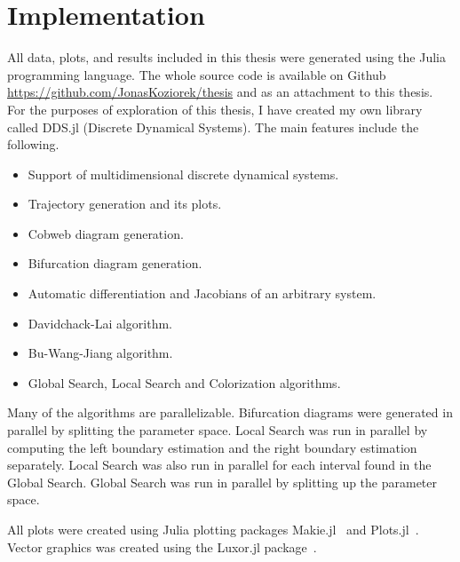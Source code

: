 \section{Implementation}
All data, plots, and results included in this thesis were generated using the Julia programming language.
The whole source code is available on Github \url{https://github.com/JonasKoziorek/thesis} and as an attachment to this thesis.
For the purposes of exploration of this thesis, I have created my own library called DDS.jl (Discrete Dynamical Systems).
The main features include the following.
\begin{itemize}
    \item Support of multidimensional discrete dynamical systems.
    \item Trajectory generation and its plots.
    \item Cobweb diagram generation.
    \item Bifurcation diagram generation.
    \item Automatic differentiation and Jacobians of an arbitrary system.
    \item Davidchack-Lai algorithm.
    \item Bu-Wang-Jiang algorithm.
    \item Global Search, Local Search and Colorization algorithms.
\end{itemize}
Many of the algorithms are parallelizable.
Bifurcation diagrams were generated in parallel by splitting the parameter space.
Local Search was run in parallel by computing the left boundary estimation and the right boundary estimation separately.
Local Search was also run in parallel for each interval found in the Global Search.
Global Search was run in parallel by splitting up the parameter space.
\par
All plots were created using Julia plotting packages Makie.jl~\cite{Danisch2021} and Plots.jl~\cite{Christ2022}.
Vector graphics was created using the Luxor.jl package~\cite{Luxor2024}.

\endinput